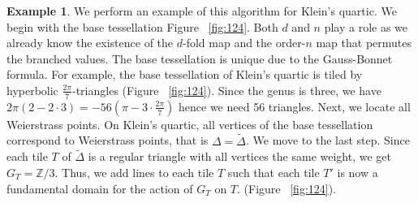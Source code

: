 \documentclass[12pt,reqno]{amsart}
\newcommand{\Z}{\mathbb{Z}}
\newcommand{\R}{\mathbb{R}}
\theoremstyle{definition}
\newtheorem{example}[theorem]{Example}
\theoremstyle{remark}
\newcommand{\ti}{\todo[inline]}
\begin{document}


\begin{example}
We perform an example of this algorithm for Klein's quartic. We begin with the base tessellation Figure~ \cref{fig:124}. Both $d$ and $n$ play a role as we already know the existence of the $d$-fold map and the order-$n$ map that permutes the branched values. The base tessellation is unique due to the Gauss-Bonnet formula. For example, the base tessellation of Klein's quartic is tiled by hyperbolic $\frac{2 \pi}{7}$-triangles (Figure~ \cref{fig:124}). Since the genus is three, we have $2 \pi (2 - 2 \cdot 3) = -56 (\pi - 3 \cdot \frac{2 \pi}{7})$ hence we need 56 triangles. Next, we locate all Weierstrass points. On Klein's quartic, all vertices of the base tessellation correspond to Weierstrass points, that is $\Delta = \widetilde{\Delta}$. We move to the last step. Since each tile $T$ of $\widetilde{\Delta}$ is a regular triangle with all vertices the same weight, we get $G_T = \Z/3$. Thus, we add lines to each tile $T$ such that each tile $T'$ is now a fundamental domain for the action of $G_T$ on $T$. (Figure~ \cref{fig:124}).


 \end{example}




\end{document}
